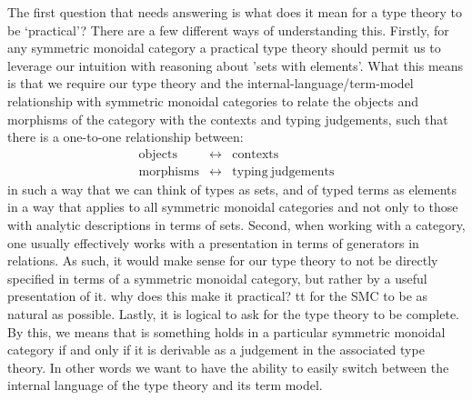 \documentclass[pra,floatfix,
amsmath,superscriptaddress, 12pt]{article}
\theoremstyle{definition}
\begin{document}
The first question that needs answering is what does it mean for a type theory to be `practical'? There are a few different ways of understanding this.
%
Firstly, for any symmetric monoidal category a practical type theory should permit us to leverage our intuition with reasoning about 'sets with elements'.
%
What this means is that we require our type theory and the internal-language/term-model relationship with symmetric monoidal categories to relate the objects and morphisms of the category with the contexts and typing judgements, {\color{red} such that there is a one-to-one relationship between:}
\begin{eqnarray*}
\mathrm{objects} & \longleftrightarrow & \mathrm{contexts}\\
\mathrm{morphisms} & \longleftrightarrow & \mathrm{typing\ judgements}
\end{eqnarray*}
in such a way that we can think of types as sets, and of typed terms as elements in a way that applies to all symmetric monoidal categories and not only to those with analytic descriptions in terms of sets.
Second, when working with a category, one usually effectively works with a presentation in terms of generators in relations. As such, it would make sense for our type theory to not be directly specified in terms of a symmetric monoidal category, but rather by a useful presentation of it.
{\color{red} why does this make it practical? tt for the SMC to be as natural as possible}. Lastly, it is logical to ask for the type theory to be complete. By this, we means that is something holds in a particular symmetric monoidal category if and only if it is derivable as a judgement in the associated type theory. {\color{red}In other words we want to have the ability to easily switch between the internal language of the type theory and its term model.}



\end{document}
